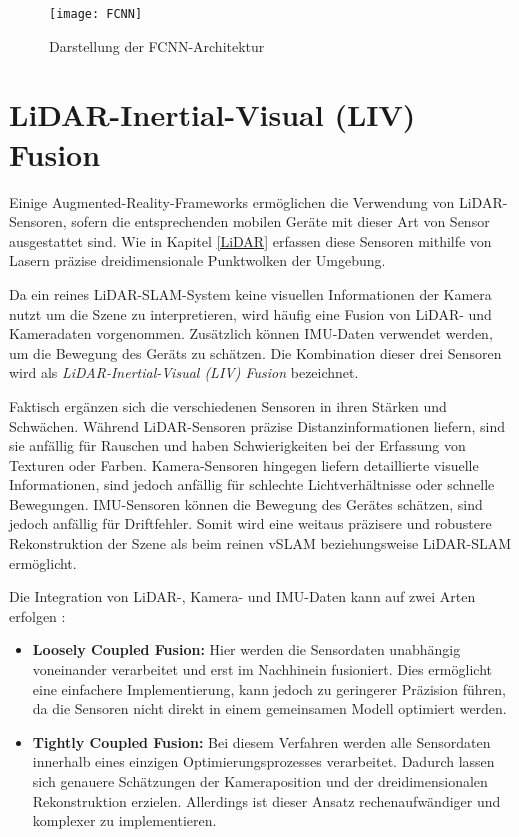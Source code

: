 \begin{figure}
    \centering
    \texttt{[image: FCNN]}
    \caption{Darstellung der FCNN-Architektur \cite{long2014fcnn}\label{fig:FCNN}}\par
\end{figure}

\section{LiDAR-Inertial-Visual (LIV) Fusion} \label{sec:LIV}

Einige Augmented-Reality-Frameworks ermöglichen die Verwendung von LiDAR-Sensoren, sofern die entsprechenden mobilen Geräte mit dieser Art von Sensor ausgestattet sind. Wie in Kapitel \ref{LiDAR} erfassen diese Sensoren mithilfe von Lasern präzise dreidimensionale Punktwolken der Umgebung. \cite{appledevdoc, doerner2022virtual}

Da ein reines LiDAR-SLAM-System keine visuellen Informationen der Kamera nutzt um die Szene zu interpretieren, wird häufig eine Fusion von LiDAR- und Kameradaten vorgenommen. Zusätzlich können IMU-Daten verwendet werden, um die Bewegung des Geräts zu schätzen. Die Kombination dieser drei Sensoren wird als \emph{LiDAR-Inertial-Visual (LIV) Fusion} bezeichnet. \cite{zhang2024lidarslam}

Faktisch ergänzen sich die verschiedenen Sensoren in ihren Stärken und Schwächen. Während LiDAR-Sensoren präzise Distanzinformationen liefern, sind sie anfällig für Rauschen und haben Schwierigkeiten bei der Erfassung von Texturen oder Farben. Kamera-Sensoren hingegen liefern detaillierte visuelle Informationen, sind jedoch anfällig für schlechte Lichtverhältnisse oder schnelle Bewegungen. IMU-Sensoren können die Bewegung des Gerätes schätzen, sind jedoch anfällig für Driftfehler. Somit wird eine weitaus präzisere und robustere Rekonstruktion der Szene als beim reinen vSLAM beziehungsweise LiDAR-SLAM ermöglicht. \cite{zhang2024lidarslam}

Die Integration von LiDAR-, Kamera- und IMU-Daten kann auf zwei Arten erfolgen \cite{zhang2024lidarslam}:
\begin{itemize}
    \item \textbf{Loosely Coupled Fusion:} Hier werden die Sensordaten unabhängig voneinander verarbeitet und erst im Nachhinein fusioniert. Dies ermöglicht eine einfachere Implementierung, kann jedoch zu geringerer Präzision führen, da die Sensoren nicht direkt in einem gemeinsamen Modell optimiert werden.
    \item \textbf{Tightly Coupled Fusion:} Bei diesem Verfahren werden alle Sensordaten innerhalb eines einzigen Optimierungsprozesses verarbeitet. Dadurch lassen sich genauere Schätzungen der Kameraposition und der dreidimensionalen Rekonstruktion erzielen. Allerdings ist dieser Ansatz rechenaufwändiger und komplexer zu implementieren.
\end{itemize}

